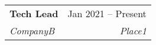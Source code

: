 \documentclass[a4paper,11pt]{article}
\makeatletter
\newcommand{\placeblock}[4]{%
    \vspace{-2pt}\item%
    \begin{tabular*}{0.97\textwidth}[t]{l@{\extracolsep{\fill}}r}%
        \textbf{#1} & #2 \\%
        \textit{\small#3} & \textit{\small #4} \\%
    \end{tabular*}\vspace{-7pt}%
}%
\newenvironment*{place}[4]{%
    \placeblock{#1}{#2}{#3}{#4}
    \begin{itemList}
}{%
    \end{itemList}
}%
\newcommand{\reflectiz}{Reflectiz}
\newcommand{\ramatgan}{Ramat Gan, Israel}
\renewcommand{\reflectiz}{CompanyB}
\renewcommand{\ramatgan}{Place1}
\newenvironment{jobReflectizLead}{%
    \begin{place}{Tech Lead}{Jan 2021 -- Present}{\reflectiz}{\ramatgan}
}{%
    \end{place}
}
\makeatother
\begin{document}
\begin{sectionList}
\begin{jobReflectizLead}
     \end{jobReflectizLead}


\end{sectionList}
\end{document}

